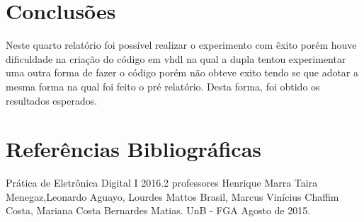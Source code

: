 \documentclass[12pts]{article}
\begin{document}
\section{Conclusões}

Neste quarto relatório foi possível realizar o experimento com êxito porém houve dificuldade na criação do código em vhdl na qual a dupla tentou experimentar uma outra forma de fazer o código porém não obteve exito tendo se que adotar a mesma forma na qual foi feito o pré relatório. Desta forma, foi obtido os resultados esperados.



\section{Referências Bibliográficas}

Prática de Eletrônica Digital I 2016.2 professores Henrique Marra Taira Menegaz,Leonardo Aguayo, Lourdes Mattos Brasil, Marcus Vinícius Chaffim Costa, Mariana Costa Bernardes Matias. UnB - FGA Agosto de 2015.

\newpage
\end{document}
